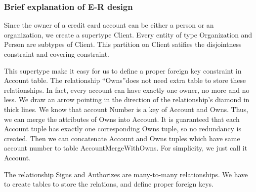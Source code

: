 \documentclass[11pt]{article}
\begin{document}
\subsubsection{Brief explanation of E-R design}
\label{sec:E-R design}

\par
Since the owner of a credit card account can be either a person or an organization, we create a supertype Client. Every entity of type Organization and Person are subtypes of Client. This partition on Client satifies the disjointness constraint and covering constraint.

\par
This supertype make it easy for us to define a proper foreign key constraint in Account table. The relationship ``Owns''does not need extra table to store these relationships. In fact, every account can have exactly one owner, no more and no less. We draw an arrow pointing in the direction of the relationship's diamond in thick lines. We know that account Number is a key of Account and Owns. Thus, we can merge the attributes of Owns into Account. It is guaranteed that each Account tuple has exactly one corresponding Owns tuple, so no redundancy is created. Then we can concatenate Account and Owns tuples which have same account number to table AccountMergeWithOwns. For simplicity, we just call it Account.

\par
The relationship Signs and Authorizes are many-to-many relationships. We have to create tables to store the relations, and define proper foreign keys.
\end{document}
